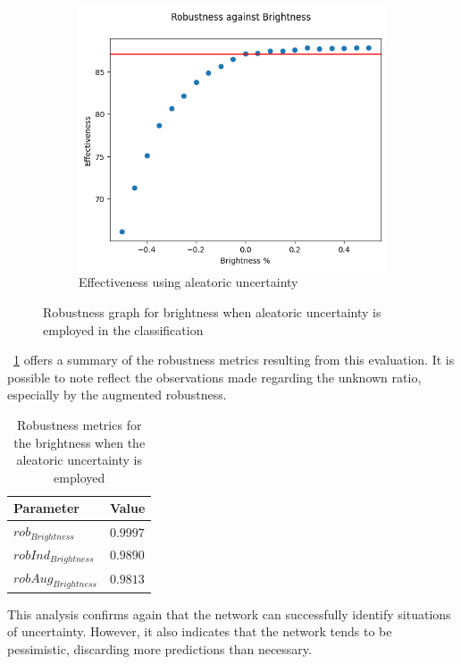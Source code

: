 \begin{figure}[h]
\begin{subfigure}{.33\textwidth}
		\centering
		\includegraphics[width=0.9\linewidth]{ImageFiles/EvalBNN/BR/AU/eff}
		\caption{Effectiveness using aleatoric uncertainty}
		\label{fig:br_au_eff}
	\end{subfigure}
	\caption{Robustness graph for brightness when aleatoric uncertainty is employed in the classification}
	\label{fig:br_au}
\end{figure}

\Tab~\ref{table:rob_br_au} offers a summary of the robustness metrics resulting from this evaluation. It is possible to note reflect the observations made regarding the unknown ratio, especially by the augmented robustness.

\begin{table}[h]
	\centering
	\begin{tabular}{|| l | l ||} 
		\hline
		\textbf{Parameter} & \textbf{Value} \\
		\hline
		\hline
		$rob_{Brightness}$ & $0.9997$ \\
		$robInd_{Brightness}$ & $0.9890$ \\
		$robAug_{Brightness}$ & $0.9813$ \\	
		\hline
	\end{tabular}	
	\caption{Robustness metrics for the brightness when the aleatoric uncertainty is employed}
	\label{table:rob_br_au}
\end{table}

This analysis confirms again that the network can successfully identify situations of uncertainty. However, it also indicates that the network tends to be pessimistic, discarding more predictions than necessary.

